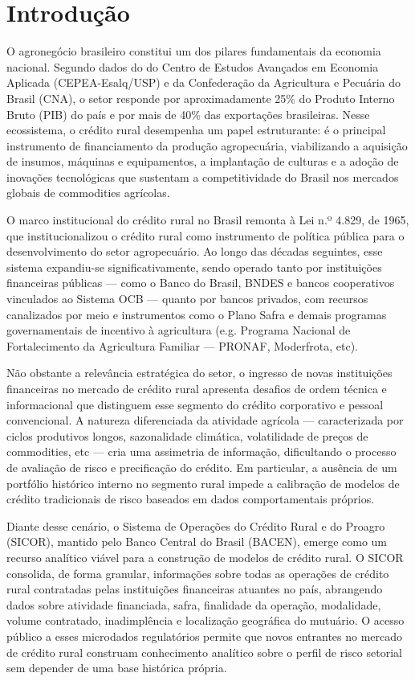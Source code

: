 \chapter{Introdução}\label{chap:intro}

O agronegócio brasileiro constitui um dos pilares fundamentais da economia nacional. Segundo dados do do Centro de Estudos Avançados em Economia Aplicada (CEPEA-Esalq/USP) e da Confederação da Agricultura e Pecuária do Brasil (CNA), o setor responde por aproximadamente 25\% do Produto Interno Bruto (PIB) do país e por mais de 40\% das exportações brasileiras. Nesse ecossistema, o crédito rural desempenha um papel estruturante: é o principal instrumento de financiamento da produção agropecuária, viabilizando a aquisição de insumos, máquinas e equipamentos, a implantação de culturas e a adoção de inovações tecnológicas que sustentam a competitividade do Brasil nos mercados globais de commodities agrícolas.

O marco institucional do crédito rural no Brasil remonta à Lei n.º 4.829, de 1965, que institucionalizou o crédito rural como instrumento de política pública para o desenvolvimento do setor agropecuário. Ao longo das décadas seguintes, esse sistema expandiu-se significativamente, sendo operado tanto por instituições financeiras públicas — como o Banco do Brasil, BNDES e bancos cooperativos vinculados ao Sistema OCB — quanto por bancos privados, com recursos canalizados por meio e instrumentos como o Plano Safra e demais programas governamentais de incentivo à agricultura (e.g. Programa Nacional de Fortalecimento da Agricultura Familiar — PRONAF, Moderfrota, etc).

Não obstante a relevância estratégica do setor, o ingresso de novas instituições financeiras no mercado de crédito rural apresenta desafios de ordem técnica e informacional que distinguem esse segmento do crédito corporativo e pessoal convencional. A natureza diferenciada da atividade agrícola — caracterizada por ciclos produtivos longos, sazonalidade climática, volatilidade de preços de commodities, etc — cria uma assimetria de informação, dificultando o processo de avaliação de risco e precificação do crédito. Em particular, a ausência de um portfólio histórico interno no segmento rural impede a calibração de modelos de crédito tradicionais de risco baseados em dados comportamentais próprios.

Diante desse cenário, o Sistema de Operações do Crédito Rural e do Proagro (SICOR), mantido pelo Banco Central do Brasil (BACEN), emerge como um recurso analítico viável para a construção de modelos de crédito rural. O SICOR consolida, de forma granular, informações sobre todas as operações de crédito rural contratadas pelas instituições financeiras atuantes no país, abrangendo dados sobre atividade financiada, safra, finalidade da operação, modalidade, volume contratado, inadimplência e localização geográfica do mutuário. O acesso público a esses microdados regulatórios permite que novos entrantes no mercado de crédito rural construam conhecimento analítico sobre o perfil de risco setorial sem depender de uma base histórica própria.


